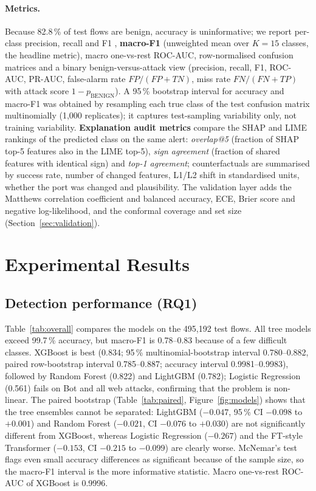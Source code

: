 \documentclass[11pt,a4paper]{article}
\begin{document}
\paragraph{Metrics.} Because 82.8\,\% of test flows are benign, accuracy is uninformative; we report per-class precision, recall and F1 \parencite{sokolova2009}, \textbf{macro-F1} (unweighted mean over $K=15$ classes, the headline metric), macro one-vs-rest ROC-AUC, row-normalised confusion matrices and a binary benign-versus-attack view (precision, recall, F1, ROC-AUC, PR-AUC, false-alarm rate $FP/(FP+TN)$, miss rate $FN/(FN+TP)$ with attack score $1-p_{\text{BENIGN}}$). A 95\,\% bootstrap interval for accuracy and macro-F1 was obtained by resampling each true class of the test confusion matrix multinomially (1{,}000 replicates); it captures test-sampling variability only, not training variability. \textbf{Explanation audit metrics} compare the SHAP and LIME rankings of the predicted class on the same alert: \emph{overlap@5} (fraction of SHAP top-5 features also in the LIME top-5), \emph{sign agreement} (fraction of shared features with identical sign) and \emph{top-1 agreement}; counterfactuals are summarised by success rate, number of changed features, L1/L2 shift in standardised units, whether the port was changed and plausibility. The validation layer adds the Matthews correlation coefficient and balanced accuracy, ECE, Brier score and negative log-likelihood, and the conformal coverage and set size (Section~\ref{sec:validation}).

\section{Experimental Results}
\label{sec:results}

\subsection{Detection performance (RQ1)}
Table~\ref{tab:overall} compares the models on the 495{,}192 test flows. All tree models exceed 99.7\,\% accuracy, but macro-F1 is 0.78--0.83 because of a few difficult classes. XGBoost is best (0.834; 95\,\% multinomial-bootstrap interval 0.780--0.882, paired row-bootstrap interval 0.785--0.887; accuracy interval 0.9981--0.9983), followed by Random Forest (0.822) and LightGBM (0.782); Logistic Regression (0.561) fails on Bot and all web attacks, confirming that the problem is non-linear. The paired bootstrap (Table~\ref{tab:paired}, Figure~\ref{fig:models}) shows that the tree ensembles cannot be separated: LightGBM ($-0.047$, 95\,\% CI $-0.098$ to $+0.001$) and Random Forest ($-0.021$, CI $-0.076$ to $+0.030$) are not significantly different from XGBoost, whereas Logistic Regression ($-0.267$) and the FT-style Transformer ($-0.153$, CI $-0.215$ to $-0.099$) are clearly worse. McNemar's test flags even small accuracy differences as significant because of the sample size, so the macro-F1 interval is the more informative statistic. Macro one-vs-rest ROC-AUC of XGBoost is 0.9996.
\end{document}
